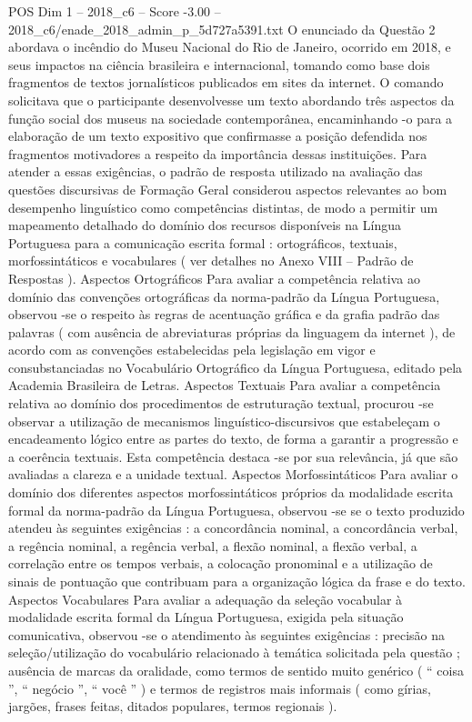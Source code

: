 \begin{textsample}{POS Dim 1 – 2018\_c6 – Score -3.00 – 2018\_c6/enade\_2018\_admin\_p\_5d727a5391.txt}
O enunciado da Questão 2 abordava o incêndio do Museu Nacional do Rio de Janeiro, ocorrido em 2018, e seus impactos na ciência brasileira e internacional, tomando como base dois fragmentos de textos jornalísticos publicados em sites da internet.
O comando solicitava que o participante desenvolvesse um texto abordando três aspectos da função social dos museus na sociedade contemporânea, encaminhando -o para a elaboração de um texto expositivo que confirmasse a posição defendida nos fragmentos motivadores a respeito da importância dessas instituições.
Para atender a essas exigências, o padrão de resposta utilizado na avaliação das questões discursivas de Formação Geral considerou aspectos relevantes ao bom desempenho linguístico como competências distintas, de modo a permitir um mapeamento detalhado do domínio dos recursos disponíveis na Língua Portuguesa para a comunicação escrita formal : ortográficos, textuais, morfossintáticos e vocabulares ( ver detalhes no Anexo VIII – Padrão de Respostas ).
Aspectos Ortográficos Para avaliar a competência relativa ao domínio das convenções ortográficas da norma-padrão da Língua Portuguesa, observou -se o respeito às regras de acentuação gráfica e da grafia padrão das palavras ( com ausência de abreviaturas próprias da linguagem da internet ), de acordo com as convenções estabelecidas pela legislação em vigor e consubstanciadas no Vocabulário Ortográfico da Língua Portuguesa, editado pela Academia Brasileira de Letras.
Aspectos Textuais Para avaliar a competência relativa ao domínio dos procedimentos de estruturação textual, procurou -se observar a utilização de mecanismos linguístico-discursivos que estabeleçam o encadeamento lógico entre as partes do texto, de forma a garantir a progressão e a coerência textuais.
Esta competência destaca -se por sua relevância, já que são avaliadas a clareza e a unidade textual.
Aspectos Morfossintáticos Para avaliar o domínio dos diferentes aspectos morfossintáticos próprios da modalidade escrita formal da norma-padrão da Língua Portuguesa, observou -se se o texto produzido atendeu às seguintes exigências : a concordância nominal, a concordância verbal, a regência nominal, a regência verbal, a flexão nominal, a flexão verbal, a correlação entre os tempos verbais, a colocação pronominal e a utilização de sinais de pontuação que contribuam para a organização lógica da frase e do texto.
Aspectos Vocabulares Para avaliar a adequação da seleção vocabular à modalidade escrita formal da Língua Portuguesa, exigida pela situação comunicativa, observou -se o atendimento às seguintes exigências : precisão na seleção/utilização do vocabulário relacionado à temática solicitada pela questão ; ausência de marcas da oralidade, como termos de sentido muito genérico ( “ coisa ”, “ negócio ”, “ você ” ) e termos de registros mais informais ( como gírias, jargões, frases feitas, ditados populares, termos regionais ).

\end{textsample}
